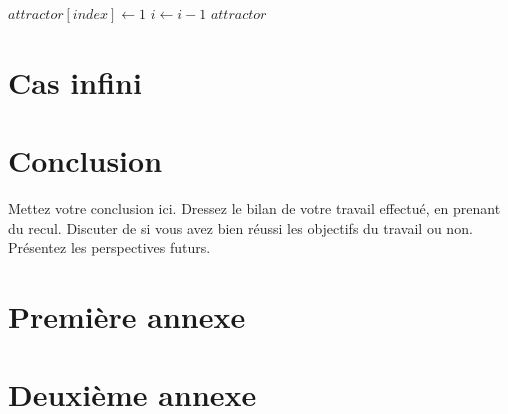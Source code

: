 \documentclass[12pt,a4paper,oneside, titlepage]{report}
\begin{document}
\newpage
\begin{algorithm}
\begin{algorithmic}[1]
			\State $attractor[index]\gets 1$
		\EndFor
		\State $i\gets i-1$
	\EndWhile
	\State\Return $attractor$
\EndProcedure
\end{algorithmic}
\end{algorithm}

\chapter{Cas infini}

\chapter*{Conclusion}
\renewcommand{\leftmark}{CONCLUSION}

Mettez votre conclusion ici.  Dressez le bilan de votre travail effectué, en prenant du recul. Discuter de si vous avez bien réussi les objectifs du travail ou non. Présentez les perspectives futurs.






\newpage
\appendix
{}

\chapter{Premi\`ere annexe}
\renewcommand{\leftmark}{ANNEXE \thechapter.~~Premi\`ere annexe}
\label{annexe1}

\chapter{Deuxi\`eme annexe}
\renewcommand{\leftmark}{ANNEXE \thechapter.~~Deuxi\`eme annexe}
\label{annexe2}

\end{document}
